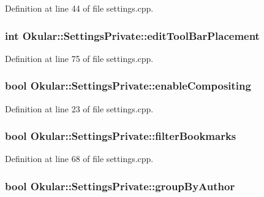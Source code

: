 Definition at line 44 of file settings.\+cpp.

\hypertarget{classOkular_1_1SettingsPrivate_a007a9a6e82a2d2dbd373c072a6aecce6}{
\subsubsection[{edit\+Tool\+Bar\+Placement}]{\setlength{\rightskip}{0pt plus 5cm}int Okular\+::\+Settings\+Private\+::edit\+Tool\+Bar\+Placement}}\label{classOkular_1_1SettingsPrivate_a007a9a6e82a2d2dbd373c072a6aecce6}


Definition at line 75 of file settings.\+cpp.

\hypertarget{classOkular_1_1SettingsPrivate_abe6f51bb5f2d64f130073b20104b3cf7}{
\subsubsection[{enable\+Compositing}]{\setlength{\rightskip}{0pt plus 5cm}bool Okular\+::\+Settings\+Private\+::enable\+Compositing}}\label{classOkular_1_1SettingsPrivate_abe6f51bb5f2d64f130073b20104b3cf7}


Definition at line 23 of file settings.\+cpp.

\hypertarget{classOkular_1_1SettingsPrivate_a0b97ff99fdd60cfcd3ee5da1f223343a}{
\subsubsection[{filter\+Bookmarks}]{\setlength{\rightskip}{0pt plus 5cm}bool Okular\+::\+Settings\+Private\+::filter\+Bookmarks}}\label{classOkular_1_1SettingsPrivate_a0b97ff99fdd60cfcd3ee5da1f223343a}


Definition at line 68 of file settings.\+cpp.

\hypertarget{classOkular_1_1SettingsPrivate_a318c47ddf7d2f0ee5688930d2bde7adb}{
\subsubsection[{group\+By\+Author}]{\setlength{\rightskip}{0pt plus 5cm}bool Okular\+::\+Settings\+Private\+::group\+By\+Author}}\label{classOkular_1_1SettingsPrivate_a318c47ddf7d2f0ee5688930d2bde7adb}


